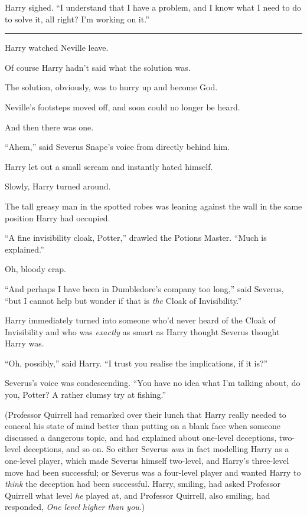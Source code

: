 Harry sighed. ``I understand that I have a problem, and I know what I
need to do to solve it, all right? I'm working on it.''

\begin{center}\rule{3in}{0.4pt}\end{center}

Harry watched Neville leave.

Of course Harry hadn't said what the solution was.

The solution, obviously, was to hurry up and become God.

Neville's footsteps moved off, and soon could no longer be heard.

And then there was one.

``Ahem,'' said Severus Snape's voice from directly behind him.

Harry let out a small scream and instantly hated himself.

Slowly, Harry turned around.

The tall greasy man in the spotted robes was leaning against the wall in
the same position Harry had occupied.

``A fine invisibility cloak, Potter,'' drawled the Potions Master.
``Much is explained.''

Oh, bloody crap.

``And perhaps I have been in Dumbledore's company too long,'' said
Severus, ``but I cannot help but wonder if that is \emph{the} Cloak of
Invisibility.''

Harry immediately turned into someone who'd never heard of the Cloak of
Invisibility and who was \emph{exactly} as smart as Harry thought
Severus thought Harry was.

``Oh, possibly,'' said Harry. ``I trust you realise the implications, if
it is?''

Severus's voice was condescending. ``You have no idea what I'm talking
about, do you, Potter? A rather clumsy try at fishing.''

(Professor Quirrell had remarked over their lunch that Harry really
needed to conceal his state of mind better than putting on a blank face
when someone discussed a dangerous topic, and had explained about
one-level deceptions, two-level deceptions, and so on. So either Severus
\emph{was} in fact modelling Harry as a one-level player, which made
Severus himself two-level, and Harry's three-level move had been
successful; or Severus was a four-level player and wanted Harry to
\emph{think} the deception had been successful. Harry, smiling, had
asked Professor Quirrell what level \emph{he} played at, and Professor
Quirrell, also smiling, had responded, \emph{One level higher than
you}.)

